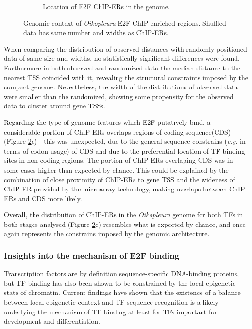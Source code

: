 \documentclass[11pt,twoside,a4paper]{report}
\begin{document}
\begin{figure}
\begin{subfigure}[b]{1\textwidth}
				\caption{Location of E2F ChIP-ERs in the genome.}
				\label{fig:genomic_location}
			\end{subfigure}
			\caption[Genomic context of E2F ChIP-enriched regions]
			{Genomic context of \textit{Oikopleura} E2F ChIP-enriched regions.
				{\footnotesize
					Shuffled data has same number and widths as ChIP-ERs.
				}
			}
			\label{fig:genomic context}
		\end{figure}
		
		When comparing the distribution of observed distances with randomly positioned data of same size and widths, no statistically significant differences were found. Furthermore in both observed and randomized data the median distance to the nearest TSS coincided with it, revealing the structural constraints imposed by the compact genome. Nevertheless, the width of the distributions of observed data were smaller than the randomized, showing some propensity for the observed data to cluster around gene TSSs.
		
		Regarding the type of genomic features which E2F putatively bind, a considerable portion of ChIP-ERs overlaps regions of coding sequence(CDS) (Figure \ref{fig:genomic context}c) - this was unexpected, due to the general sequence constrains (\textit{e.g.} in terms of codon usage) of CDS and due to the preferential location of TF binding sites in non-coding regions. The portion of ChIP-ERs overlaping CDS was in some cases higher than expected by chance. This could be explained  by the combination of close proximity of ChIP-ERs to gene TSS and the wideness of ChIP-ER provided by the microarray technology, making overlaps between ChIP-ERs and CDS more likely.
		
		Overall, the distribution of ChIP-ERs in the \textit{Oikopleura} genome for both TFs in both stages analysed (Figure \ref{fig:genomic context}c) resembles what is expected by chance, and once again represents the constrains imposed by the genomic architecture.

		\subsubsection{Insights into the mechanism of E2F binding}
		
		Transcription factors are by definition sequence-specific DNA-binding proteins, but TF binding has also been shown to be constrained by the local epigenetic state of chromatin. Current findings have shown that the existence of a balance between local epigenetic context and TF sequence recognition is a likely underlying the mechanism of TF binding at least for TFs important for development and differentiation.
		
\end{document}
